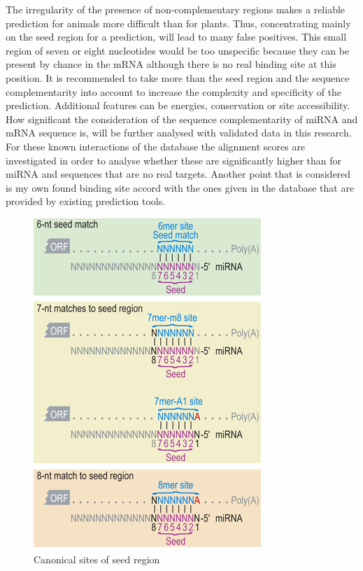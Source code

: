 \documentclass[11pt, a4paper, twoside]{book}
\begin{document}
The irregularity of the presence of non-complementary regions makes a reliable prediction for animals more difficult than for plants. Thus, concentrating mainly on the seed region for a prediction, will lead to many false positives. This small region of seven or eight nucleotides would be too unspecific because they can be present by chance in the mRNA although there is no real binding site at this position. It is recommended to take more than the seed region and the sequence complementarity into account to increase the complexity and specificity of the prediction. Additional features can be energies, conservation or site accessibility. How significant the consideration of the sequence complementarity of miRNA and mRNA sequence is, will be further analysed with validated data in this research. For these known interactions of the database the alignment scores are investigated in order to analyse whether these are significantly higher than for miRNA and sequences that are no real targets. Another point that is considered is my own found binding site accord with the ones given in the database that are provided by existing prediction tools. \\


\begin{figure}
\centering
\includegraphics[scale=0.6]{results/canonical_sites.png}
\caption{Canonical sites of seed region}
\label{Fig:canonical}
\end{figure}
\end{document}
